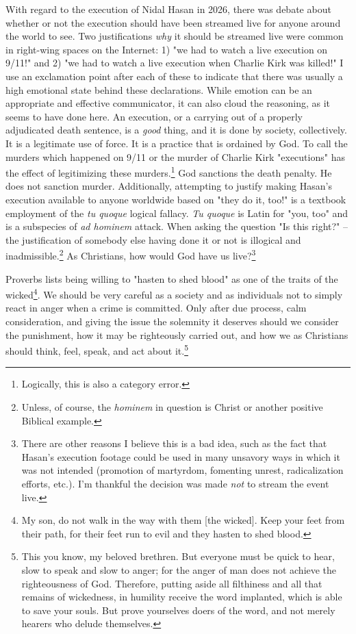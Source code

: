 With regard to the execution of Nidal Hasan in 2026, there was debate about whether or not the execution should have been streamed live for anyone around the world to see.  Two justifications \textit{why} it should be streamed live were common in right-wing spaces on the Internet: 1) "we had to watch a live execution on 9/11!" and 2) "we had to watch a live execution when Charlie Kirk was killed!"  I use an exclamation point after each of these to indicate that there was usually a high emotional state behind these declarations.  While emotion can be an appropriate and effective communicator, it can also cloud the reasoning, as it seems to have done here.  An execution, or a carrying out of a properly adjudicated death sentence, is a \textit{good} thing, and it is done by society, collectively.  It is a legitimate use of force.  It is a practice that is ordained by God.  To call the murders which happened on 9/11 or the murder of Charlie Kirk "executions" has the effect of legitimizing these murders.\footnote{Logically, this is also a category error.}  God sanctions the death penalty.  He does not sanction murder.  Additionally, attempting to justify making Hasan's execution available to anyone worldwide based on "they do it, too!" is a textbook employment of the \textit{tu quoque} logical fallacy.  \textit{Tu quoque} is Latin for "you, too" and is a subspecies of \textit{ad hominem} attack.  When asking the question "Is this right?" -- the justification of somebody else having done it or not is illogical and inadmissible.\footnote{Unless, of course, the \textit{hominem} in question is Christ or another positive Biblical example.}  As Christians, how would God have us live?\footnote{There are other reasons I believe this is a bad idea, such as the fact that Hasan's execution footage could be used in many unsavory ways in which it was not intended (promotion of martyrdom, fomenting unrest, radicalization efforts, etc.).  I'm thankful the decision was made \textit{not} to stream the event live.}

Proverbs lists being willing to "hasten to shed blood" as one of the traits of the wicked\footnote{My son, do not walk in the way with them [the wicked].  Keep your feet from their path, for their feet run to evil and they hasten to shed blood.}.  We should be very careful as a society and as individuals not to simply react in anger when a crime is committed. Only after due process, calm consideration, and giving the issue the solemnity it deserves should we consider the punishment, how it may be righteously carried out, and how we as Christians should think, feel, speak, and act about it.\footnote{This you know, my beloved brethren. But everyone must be quick to hear, slow to speak and slow to anger; for the anger of man does not achieve the righteousness of God. Therefore, putting aside all filthiness and all that remains of wickedness, in humility receive the word implanted, which is able to save your souls. But prove yourselves doers of the word, and not merely hearers who delude themselves.}

